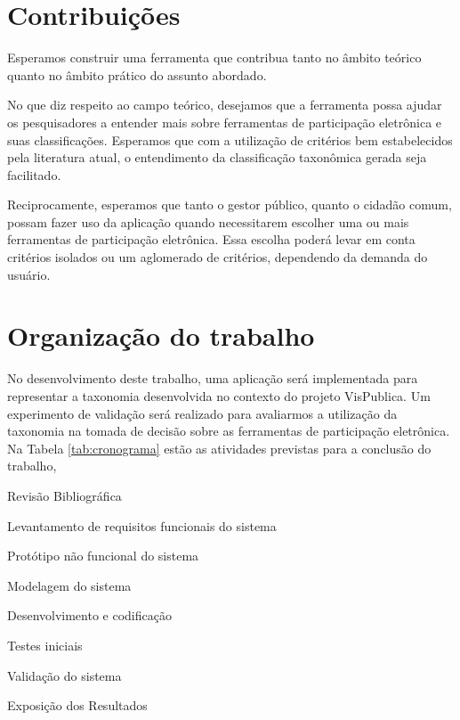 \section{Contribuições}
\label{sec:contribuicoes}
Esperamos construir uma ferramenta que contribua tanto no âmbito teórico quanto no âmbito prático do assunto abordado. 
\par
No que diz respeito ao campo teórico, desejamos que a ferramenta possa ajudar os pesquisadores a entender mais sobre ferramentas de participação eletrônica e suas classificações. 
Esperamos que com a utilização de critérios bem estabelecidos pela literatura atual, o entendimento da classificação taxonômica gerada seja facilitado.
\par
Reciprocamente, esperamos que tanto o gestor público, quanto o cidadão comum, possam fazer uso da aplicação quando necessitarem escolher uma ou mais ferramentas de participação
eletrônica. Essa escolha poderá levar em conta critérios isolados ou um aglomerado de critérios, dependendo da demanda do usuário.

\section{Organização do trabalho}
\label{sec:organizacao}
No desenvolvimento deste trabalho, uma aplicação será implementada para representar a taxonomia desenvolvida no contexto do projeto VisPublica.
Um experimento de validação será realizado para avaliarmos a utilização da taxonomia na tomada de decisão sobre as ferramentas de participação eletrônica.
Na Tabela \ref{tab:cronograma} estão as atividades previstas para a conclusão do trabalho, 
\begin{enumerate}
    \begin{singlespace}
    \fontsize{10}{12}\selectfont 
    \item\label{revisao}Revisão Bibliográfica
    \item\label{requisitos} Levantamento de requisitos funcionais do sistema
    \item\label{prototipo} Protótipo não funcional do sistema
    \item\label{modelagem} Modelagem do sistema
    \item\label{dev} Desenvolvimento e codificação
    \item\label{teste} Testes iniciais
    \item\label{validacao} Validação do sistema
    \item\label{expo} Exposição dos Resultados
    \end{singlespace}
\end{enumerate}
\newpage

